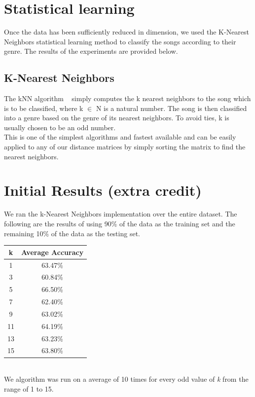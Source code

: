 \documentclass[12pt]{article}
\begin{document}
\section{Statistical learning}
\begin{flushleft}
Once the data has been sufficiently reduced in dimension, we used the K-Nearest Neighbors statistical learning method to classify the songs according to their genre. The results of the experiments are provided below.
\vspace{0.5em}
\subsection{K-Nearest Neighbors}
The kNN algorithm               ~\cite{KNN} simply computes the k nearest neighbors to the song which is to be classified, where k $\in$ N is a natural number. The song is then classified into a genre based on the genre of its nearest neighbors. To avoid ties, k is usually chosen to be an odd number.\\
\vspace{0.5em}
This is one of the simplest algorithms and fastest available and can be easily applied to any of our distance matrices by simply sorting the matrix to find the nearest neighbors.
\end{flushleft}
\section{Initial Results (extra credit)}
\begin{flushleft}
We ran the k-Nearest Neighbors implementation over the entire dataset. The following are the results of using 90\% of the data as the training set and the remaining 10\% of the data as the testing set.\\
\vspace{0.5em}
\begin{tabular}{ |c|c|} 
 \hline
 \textbf{k} & \textbf{Average Accuracy} \\ \hline
 1 & 63.47\% \\ \hline
 3 & 60.84\% \\ \hline
 5 & 66.50\% \\ \hline
 7 & 62.40\% \\ \hline
 9 & 63.02\% \\ \hline
 11 & 64.19\% \\ \hline
 13 & 63.23\% \\ \hline
 15 & 63.80\% \\ \hline
\end{tabular}
\\
\vspace{0.5em}
We algorithm was run on a average of 10 times for every odd value of \textit{k} from the range of 1 to 15. 
\end{flushleft}
\end{document}
